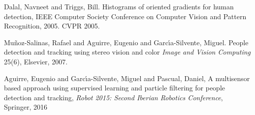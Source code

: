 \documentclass{svproc}
\begin{document}















%
\begin{thebibliography}{6}

Dalal, Navneet and Triggs, Bill.
Histograms of oriented gradients for human detection, 
IEEE Computer Society Conference on Computer Vision and Pattern Recognition, 2005. CVPR 2005.

Mu{\~n}oz-Salinas, Rafael and Aguirre, Eugenio and Garc{\'\i}a-Silvente, Miguel.
People detection and tracking using stereo vision and color
\textit{Image and Vision Computing} 25(6), Elsevier, 2007.


Aguirre, Eugenio and Garc{\'\i}a-Silvente, Miguel and Pascual, Daniel,
A multisensor based approach using supervised learning and particle filtering for people detection and tracking,
\textit{Robot 2015: Second Iberian Robotics Conference}, Springer, 2016


\end{thebibliography}
\end{document}
